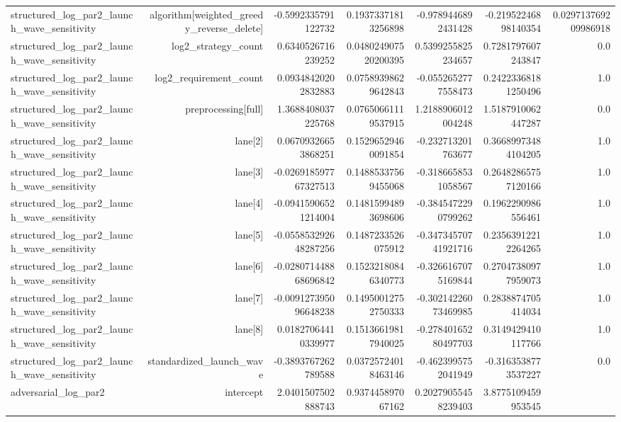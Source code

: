 {\begin{longtable}{lrrrrrr}
structured\_log\_par2\_launch\_wave\_sensitivity & algorithm[weighted\_greedy\_reverse\_delete] & -0.5992335791122732 & 0.19373371813256898 & -0.9789446892431428 & -0.21952246898140354 & 0.029713769209986918 \\
structured\_log\_par2\_launch\_wave\_sensitivity & log2\_strategy\_count & 0.6340526716239252 & 0.048024907520200395 & 0.5399255825234657 & 0.7281797607243847 & 0.0 \\
structured\_log\_par2\_launch\_wave\_sensitivity & log2\_requirement\_count & 0.09348420202832883 & 0.07589398629642843 & -0.0552652777558473 & 0.24223368181250496 & 1.0 \\
structured\_log\_par2\_launch\_wave\_sensitivity & preprocessing[full] & 1.3688408037225768 & 0.07650661119537915 & 1.2188906012004248 & 1.5187910062447287 & 0.0 \\
structured\_log\_par2\_launch\_wave\_sensitivity & lane[2] & 0.06709326653868251 & 0.15296529460091854 & -0.232713201763677 & 0.36689973484104205 & 1.0 \\
structured\_log\_par2\_launch\_wave\_sensitivity & lane[3] & -0.026918597767327513 & 0.14885337569455068 & -0.3186658531058567 & 0.26482865757120166 & 1.0 \\
structured\_log\_par2\_launch\_wave\_sensitivity & lane[4] & -0.09415906521214004 & 0.14815994893698606 & -0.3845472290799262 & 0.1962290986556461 & 1.0 \\
structured\_log\_par2\_launch\_wave\_sensitivity & lane[5] & -0.055853292648287256 & 0.1487233526075912 & -0.34734570741921716 & 0.23563912212264265 & 1.0 \\
structured\_log\_par2\_launch\_wave\_sensitivity & lane[6] & -0.028071448868696842 & 0.15232180846340773 & -0.3266167075169844 & 0.27047380977959073 & 1.0 \\
structured\_log\_par2\_launch\_wave\_sensitivity & lane[7] & -0.009127395096648238 & 0.14950012752750333 & -0.30214226073469985 & 0.2838874705414034 & 1.0 \\
structured\_log\_par2\_launch\_wave\_sensitivity & lane[8] & 0.01827064410339977 & 0.15136619817940025 & -0.27840165280497703 & 0.3149429410117766 & 1.0 \\
structured\_log\_par2\_launch\_wave\_sensitivity & standardized\_launch\_wave & -0.3893767262789588 & 0.03725724018463146 & -0.4623995752041949 & -0.3163538773537227 & 0.0 \\
adversarial\_log\_par2 & intercept & 2.0401507502888743 & 0.937445897067162 & 0.20279055458239403 & 3.8775109459953545 &  \\

\end{longtable}}
